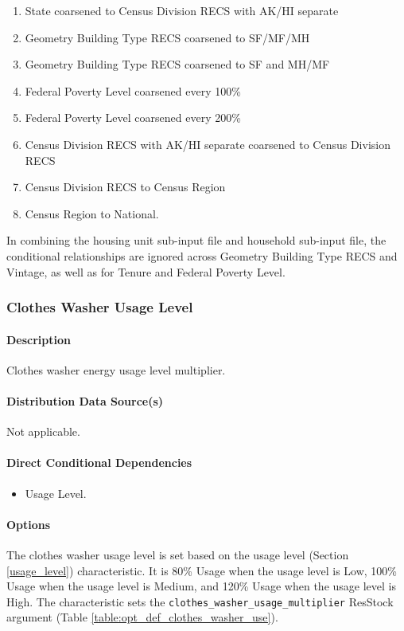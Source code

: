 \begin{enumerate}
    \item State coarsened to Census Division RECS with AK/HI separate 
    \item  Geometry Building Type RECS coarsened to SF/MF/MH 
    \item  Geometry Building Type RECS coarsened to SF and MH/MF
    \item  Federal Poverty Level coarsened every 100\% 
    \item Federal Poverty Level coarsened every 200\% 
    \item  Census Division RECS with AK/HI separate coarsened to Census Division RECS
    \item Census Division RECS to Census Region
    \item Census Region to National. 
\end{enumerate}

In combining the housing unit sub-input file and household sub-input file, the conditional relationships are ignored across Geometry Building Type RECS and Vintage, as well as for Tenure and Federal Poverty Level.

\subsubsection{Clothes Washer Usage Level}\label{clothes_washer_usage_level}
\paragraph{Description}
Clothes washer energy usage level multiplier.

\paragraph{Distribution Data Source(s)}
Not applicable.

\paragraph{Direct Conditional Dependencies}
\begin{itemize}
    \item Usage Level.
\end{itemize}

\paragraph{Options}
The clothes washer usage level is set based on the usage level (Section \ref{usage_level}) characteristic. It is 80\% Usage when the usage level is Low, 100\% Usage when the usage level is Medium, and 120\% Usage when the usage level is High. The characteristic sets the \texttt{clothes\_washer\_usage\_multiplier} ResStock argument (Table \ref{table:opt_def_clothes_washer_use}).

